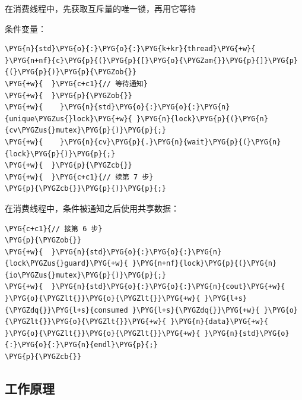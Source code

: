 
在消费线程中，先获取互斥量的唯一锁，再用它等待



条件变量：



\begin{codeblockbg}
\begin{Verbatim}[commandchars=\\\{\},breaklines=true,breakanywhere=true,fontsize=\codefont,xleftmargin=17bp]
\PYG{n}{std}\PYG{o}{:}\PYG{o}{:}\PYG{k+kr}{thread}\PYG{+w}{ }\PYG{n+nf}{c}\PYG{p}{(}\PYG{p}{[}\PYG{o}{\PYGZam{}}\PYG{p}{]}\PYG{p}{(}\PYG{p}{)}\PYG{p}{\PYGZob{}}
\PYG{+w}{  }\PYG{c+c1}{// 等待通知}
\PYG{+w}{  }\PYG{p}{\PYGZob{}}
\PYG{+w}{    }\PYG{n}{std}\PYG{o}{:}\PYG{o}{:}\PYG{n}{unique\PYGZus{}lock}\PYG{+w}{ }\PYG{n}{lock}\PYG{p}{(}\PYG{n}{cv\PYGZus{}mutex}\PYG{p}{)}\PYG{p}{;}
\PYG{+w}{    }\PYG{n}{cv}\PYG{p}{.}\PYG{n}{wait}\PYG{p}{(}\PYG{n}{lock}\PYG{p}{)}\PYG{p}{;}
\PYG{+w}{  }\PYG{p}{\PYGZcb{}}
\PYG{+w}{  }\PYG{c+c1}{// 续第 7 步}
\PYG{p}{\PYGZcb{}}\PYG{p}{)}\PYG{p}{;}
\end{Verbatim}
\end{codeblockbg}



在消费线程中，条件被通知之后使用共享数据：



\begin{codeblockbg}
\begin{Verbatim}[commandchars=\\\{\},breaklines=true,breakanywhere=true,fontsize=\codefont,xleftmargin=17bp]
\PYG{c+c1}{// 接第 6 步}
\PYG{p}{\PYGZob{}}
\PYG{+w}{  }\PYG{n}{std}\PYG{o}{:}\PYG{o}{:}\PYG{n}{lock\PYGZus{}guard}\PYG{+w}{ }\PYG{n+nf}{lock}\PYG{p}{(}\PYG{n}{io\PYGZus{}mutex}\PYG{p}{)}\PYG{p}{;}
\PYG{+w}{  }\PYG{n}{std}\PYG{o}{:}\PYG{o}{:}\PYG{n}{cout}\PYG{+w}{ }\PYG{o}{\PYGZlt{}}\PYG{o}{\PYGZlt{}}\PYG{+w}{ }\PYG{l+s}{\PYGZdq{}}\PYG{l+s}{consumed }\PYG{l+s}{\PYGZdq{}}\PYG{+w}{ }\PYG{o}{\PYGZlt{}}\PYG{o}{\PYGZlt{}}\PYG{+w}{ }\PYG{n}{data}\PYG{+w}{ }\PYG{o}{\PYGZlt{}}\PYG{o}{\PYGZlt{}}\PYG{+w}{ }\PYG{n}{std}\PYG{o}{:}\PYG{o}{:}\PYG{n}{endl}\PYG{p}{;}
\PYG{p}{\PYGZcb{}}
\end{Verbatim}
\end{codeblockbg}



\subsection{工作原理}


